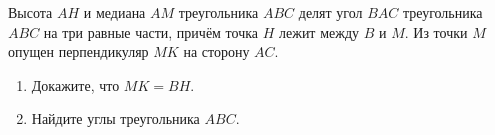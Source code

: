 \begin{ex}
	\begin{condition}
		Высота \( AH  \) и медиана \( AM  \) треугольника \( ABC \) делят угол \( BAC \) треугольника \( ABC \) на три равные части, причём точка \( H  \) лежит между \( B \) и \( M \). Из точки \( M  \) опущен перпендикуляр \( MK  \) на сторону \( AC \).
		\begin{enumerate}
			\item Докажите, что \( MK =BH \).
			\item Найдите углы треугольника \( ABC \).
		\end{enumerate}
	\end{condition}
\end{ex}